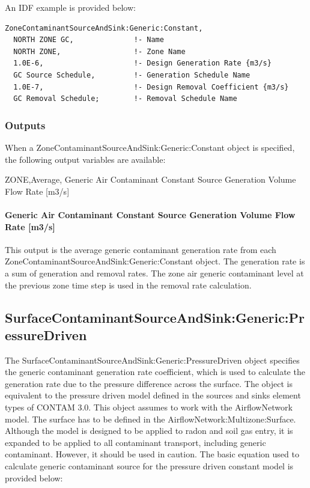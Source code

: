 An IDF example is provided below:

\begin{lstlisting}
ZoneContaminantSourceAndSink:Generic:Constant,
  NORTH ZONE GC,              !- Name
  NORTH ZONE,                 !- Zone Name
  1.0E-6,                     !- Design Generation Rate {m3/s}
  GC Source Schedule,         !- Generation Schedule Name
  1.0E-7,                     !- Design Removal Coefficient {m3/s}
  GC Removal Schedule;        !- Removal Schedule Name
\end{lstlisting}

\subsubsection{Outputs}\label{outputs-7-004}

When a ZoneContaminantSourceAndSink:Generic:Constant object is specified, the following output variables are available:

ZONE,Average, Generic Air Contaminant Constant Source Generation Volume Flow Rate {[}m3/s{]}

\paragraph{Generic Air Contaminant Constant Source Generation Volume Flow Rate {[}m3/s{]}}\label{generic-air-contaminant-constant-source-generation-volume-flow-rate-m3s}

This output is the average generic contaminant generation rate from each ZoneContaminantSourceAndSink:Generic:Constant object. The generation rate is a sum of generation and removal rates. The zone air generic contaminant level at the previous zone time step is used in the removal rate calculation.

\subsection{Surface\-Contaminant\-Source\-And\-Sink:\-Generic:\-Pressure\-Driven}\label{surfacecontaminantsourceandsinkgenericpressuredriven}

The Surface\-Contaminant\-Source\-And\-Sink:\-Generic:\-Pressure\-Driven object specifies the generic contaminant generation rate coefficient, which is used to calculate the generation rate due to the pressure difference across the surface. The object is equivalent to the pressure driven model defined in the sources and sinks element types of CONTAM 3.0. This object assumes to work with the AirflowNetwork model. The surface has to be defined in the AirflowNetwork:Multizone:Surface. Although the model is designed to be applied to radon and soil gas entry, it is expanded to be applied to all contaminant transport, including generic contaminant. However, it should be used in caution. The basic equation used to calculate generic contaminant source for the pressure driven constant model is provided below:

